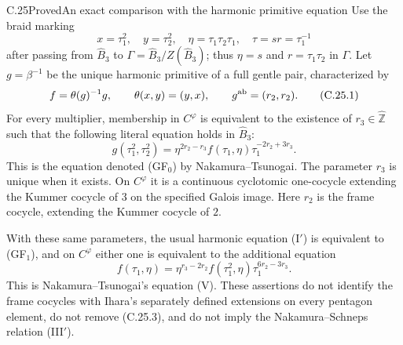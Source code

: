 \begin{statement}{C.25}{Proved}{An exact comparison with the harmonic primitive equation}
Use the braid marking
\[
 x=\tau_1^2,\quad y=\tau_2^2,\quad
 \eta=\tau_1\tau_2\tau_1,\quad
 \tau=sr=\tau_1^{-1}
\]
after passing from $\widehat B_3$ to
$\Gamma=\widehat B_3/Z(\widehat B_3)$; thus
$\eta=s$ and $r=\tau_1\tau_2$ in $\Gamma$.
Let $g=\beta^{-1}$ be the unique harmonic primitive
of a full gentle pair, characterized by
\[
 f=\theta(g)^{-1}g,\qquad
 \theta(x,y)=(y,x),\qquad
                  g^{\rm ab}=(r_2,r_2).
 \tag{C.25.1}
\]
For every multiplier, membership in $C^\varphi$
is equivalent to the existence of $r_3\in\widehat{\mathbb Z}$
such that the following literal equation holds
in $\widehat B_3$:
\[
 g(\tau_1^2,\tau_2^2)
 =\eta^{2r_2-r_3}f(\tau_1,\eta)
                   \tau_1^{-2r_2+3r_3}.
 \tag{C.25.2}
\]
This is the equation denoted (GF$_0$) by
Nakamura--Tsunogai. The parameter $r_3$ is unique
when it exists. On $C^\varphi$ it is a continuous
cyclotomic one-cocycle extending the Kummer
cocycle of $3$ on the specified Galois image.
Here $r_2$ is the frame cocycle, extending the
Kummer cocycle of $2$.

With these same parameters, the usual harmonic
equation (I$'$) is equivalent to (GF$_1$), and
on $C^\varphi$ either one is equivalent to the
additional equation
\[
 f(\tau_1,\eta)
 =\eta^{r_3-2r_2}f(\tau_1^2,\eta)
                   \tau_1^{6r_2-3r_3}.
 \tag{C.25.3}
\]
This is Nakamura--Tsunogai's equation (V).
These assertions do not identify the frame
cocycles with Ihara's separately defined
extensions on every pentagon element, do not
remove (C.25.3), and do not imply the
Nakamura--Schneps relation (III$'$).
\end{statement}
